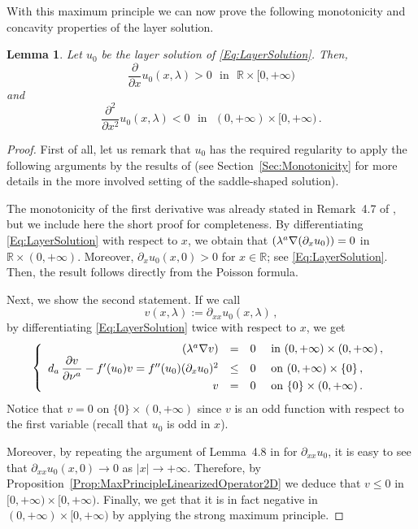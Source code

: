 \documentclass[twoside,leqno,symbols-for-thanks, draft]{rmi}
\numberwithin{equation}{section}
\newtheorem{lemma}[theorem]{Lemma}
\theoremstyle{definition}
\newcommand{\con}[1]{\mathbb{#1}}
\newcommand{\R}{\con{R}} %
\newcommand\beqc[1]{\left\{\begin{array}{#1}}
\newcommand\eeqc{\end{array} \right.}
\def\PDEsystem{rcll}
\let\div\relax
\DeclareMathOperator{\div}{div}
\begin{document}
With this maximum principle we can now prove the following monotonicity and concavity properties of the layer solution.

\begin{lemma}
	\label{Lemma:MonotonicityLayer}
	Let $u_0$ be the layer solution of \eqref{Eq:LayerSolution}. Then,
	$$ \frac{\partial}{\partial x} u_0(x,\lambda) > 0 \ \ \ \text{in} \ \ \ \R\times [0,+\infty) $$
	and
	$$ \frac{\partial^2}{\partial x^2} u_0(x,\lambda) < 0 \ \ \ \text{in} \ \ \ (0,+\infty)\times [0,+\infty)\,. $$
\end{lemma}

\begin{proof}
	First of all, let us remark that $u_0$ has the required regularity to apply the following arguments by the results of \cite{CabreSireI} (see Section~\ref{Sec:Monotonicity} for more details in the more involved setting of the saddle-shaped solution).
	
	
	The monotonicity of the first derivative was already stated in Remark~4.7 of \cite{CabreSireI}, but we include here the short proof for completeness. By differentiating \eqref{Eq:LayerSolution} with respect to $x$, we obtain that $\div(\lambda^a \nabla (\partial_x u_0)) = 0$ in $\R\times (0,+\infty)$. Moreover,  $\partial_x u_0(x,0) > 0$ for $x\in \R$; see \eqref{Eq:LayerSolution}. Then, the result follows directly from the Poisson formula.
	
	Next, we show the second statement. If we call 
	$$
	v(x,\lambda) := \partial_{xx} u_0(x,\lambda)\,,
	$$
	by differentiating \eqref{Eq:LayerSolution} twice with respect to $x$, we get
	\begin{equation*}
	\beqc{\PDEsystem}
	\div(\lambda^a \nabla v) &=& 0 & \text{ in } (0,+\infty)\times (0,+\infty) \,, \\
	d_a\,\dfrac{\partial v}{\partial \nu^a} - f'(u_0) v = f''(u_0) (\partial_x u_0) ^2 &\leq & 0 & \text{ on } (0,+\infty) \times \{0\} \,, \\
	v & = & 0 & \text{ on } \{0\} \times (0,+\infty)\,.
	\eeqc
	\end{equation*}
	Notice that $v = 0$ on $\{0\} \times (0,+\infty)$ since $v$ is an odd function with respect to the first variable (recall that $u_0$ is odd in $x$).
	
	Moreover, by repeating the argument of Lemma~4.8 in \cite{CabreSireI} for $\partial_{xx} u_0$, it is easy to see that $\partial_{xx} u_0(x,0) \to 0$ as $|x|\to +\infty$. Therefore, by Proposition~\ref{Prop:MaxPrincipleLinearizedOperator2D} we deduce that $v\leq 0$ in $[0,+\infty)\times [0,+\infty)$. Finally, we get that it is in fact negative in $(0,+\infty)\times [0,+\infty)$ by applying the strong maximum principle.
\end{proof}
\end{document}
